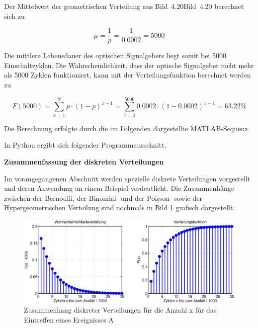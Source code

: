 \noindent Der Mittelwert der geometrischen Verteilung aus Bild~4.20Bild~4.20 berechnet sich zu

\begin{equation}\label{eq:fourhundredsixtytwo}
\mu =\dfrac{1}{p} =\dfrac{1}{0.0002} =5000
\end{equation}

\noindent Die mittlere Lebensdauer des optischen Signalgebers liegt somit bei 5000 Einschaltzyklen. Die Wahrscheinlichkeit, dass der optische Signalgeber nicht mehr als 5000 Zyklen funktioniert, kann mit der Verteilungsfunktion berechnet werden zu

\begin{equation}\label{eq:fourhundredsixtythree}
F(5000)=\sum _{x=1}^{N}p\cdot (1-p)^{x-1} =\sum _{x=1}^{5000}0.0002\cdot (1-0.0002)^{x-1} =63.22\% 
\end{equation}

\noindent Die Berechnung erfolgte durch die im Folgenden dargestellte MATLAB-Sequenz.

\clearpage 




\noindent In Python ergibt sich folgender Programmausschnitt.



{\selectfont
\noindent\textbf{ Zusammenfassung der diskreten Verteilungen}}\smallskip

\noindent Im vorangegangenen Abschnitt werden spezielle diskrete Verteilungen vorgestellt und deren Anwendung an einem Beispiel verdeutlicht. Die Zusammenh\"{a}nge zwischen der Bernoulli, der Binomial- und der Poisson- sowie der Hypergeometrischen Verteilung sind nochmals in Bild \ref{fig:UebersichtDiskreteVerteilungen} grafisch dargestellt. 

\noindent 
\begin{figure}[H]
  \centerline{\includegraphics[width=1\textwidth]{Kapitel4/Bilder/image20}}
  \caption{Zusammenhang diskreter Verteilungen f\"{u}r die Anzahl x f\"{u}r das Eintreffen eines Ereignisses A}
  \label{fig:UebersichtDiskreteVerteilungen}
\end{figure}


